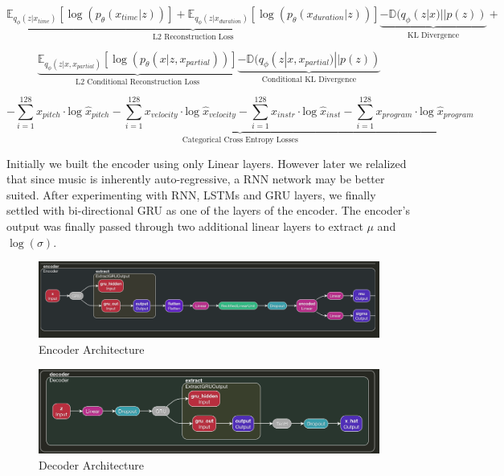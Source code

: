 \documentclass{article}
\begin{document}
$$ \underbrace{\mathbb{E}_{q_{\phi}(z|x_{time})} [ \log(p_{\theta}(x_{time}|z))] + \mathbb{E}_{q_{\phi}(z|x_{duration})} [ \log(p_{\theta}(x_{duration}|z))]}_{\text{L2 Reconstruction Loss}}  \underbrace{- \mathbb{D}(q_{\phi}(z|x) || p(z)) }_{\text{KL Divergence}} + $$ 

$$ \underbrace{ \mathbb{E}_{q_{\phi}(z|x,x_{partial})} [ \log(p_{\theta}(x|z, x_{partial}))]}_{\text{L2 Conditional Reconstruction Loss}} \underbrace{-\mathbb{D}(q_{\phi}(z|x, x_{partial}) || p(z))}_{\text{Conditional KL Divergence}} $$

$$ \underbrace{-\sum_{i=1}^{128} x_{pitch} \cdot \mathrm{log}\; {\hat{x}}_{pitch}  - \sum_{i=1}^{128} x_{velocity} \cdot \mathrm{log}\; {\hat{x}}_{velocity} - \sum_{i=1}^{128} x_{instr} \cdot \mathrm{log}\; {\hat{x}}_{inst} -\sum_{i=1}^{128} x_{program} \cdot \mathrm{log}\; {\hat{x}}_{program}}_{\text{Categorical Cross Entropy Losses}} $$

Initially we built the encoder using only Linear layers. However later we relalized that since music is inherently auto-regressive, a RNN network may be better suited. After experimenting with RNN, LSTMs and GRU layers, we finally settled with bi-directional GRU as one of the layers of the encoder. The encoder's output was finally passed through two additional linear layers to extract $\mu$ and $ \log(\sigma)$.

\begin{center}
\begin{figure}
\includegraphics[width=1.0\linewidth]{encoder.png}
\caption{Encoder Architecture}
\end{figure}
\end{center}

\begin{center}
\begin{figure}
\includegraphics[width=1.0\linewidth]{decoder.png}
\caption{Decoder Architecture}
\end{figure}
\end{center}
\end{document}
